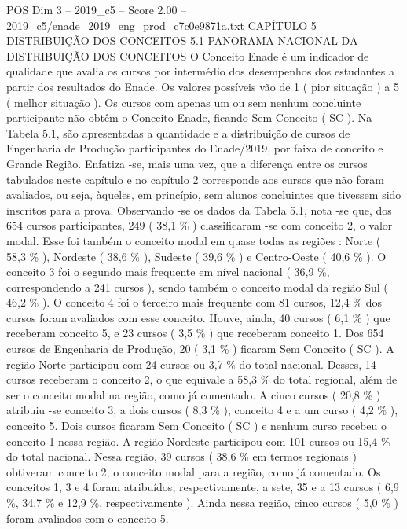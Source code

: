 \begin{textsample}{POS Dim 3 – 2019\_c5 – Score 2.00 – 2019\_c5/enade\_2019\_eng\_prod\_c7c0e9871a.txt}  \label{ex:f3_pos_074}
CAPÍTULO 5 DISTRIBUIÇÃO DOS CONCEITOS 5.1 PANORAMA NACIONAL DA DISTRIBUIÇÃO DOS CONCEITOS O Conceito Enade é um indicador de qualidade que avalia os cursos por intermédio dos desempenhos dos estudantes a partir dos resultados do Enade.
Os valores possíveis vão de 1 ( pior situação ) a 5 ( melhor situação ).
Os cursos com apenas um ou sem nenhum concluinte participante não obtêm o Conceito Enade, ficando Sem Conceito ( SC ).
Na Tabela 5.1, são apresentadas a quantidade e a distribuição de cursos de Engenharia de Produção participantes do Enade/2019, por faixa de conceito e Grande Região.
Enfatiza -se, mais uma vez, que a diferença entre os cursos tabulados neste capítulo e no capítulo 2 corresponde aos cursos que não foram avaliados, ou seja, àqueles, em princípio, sem alunos concluintes que tivessem sido inscritos para a prova.
Observando -se os dados da Tabela 5.1, nota -se que, dos 654 cursos participantes, 249 ( 38,1 \% ) classificaram -se com conceito 2, o valor modal.
Esse foi também o conceito modal em quase todas as regiões : Norte ( 58,3 \% ), Nordeste ( 38,6 \% ), Sudeste ( 39,6 \% ) e Centro-Oeste ( 40,6 \% ).
O conceito 3 foi o segundo mais frequente em nível nacional ( 36,9 \%, correspondendo a 241 cursos ), sendo também o conceito modal da região Sul ( 46,2 \% ).
O conceito 4 foi o terceiro mais frequente com 81 cursos, 12,4 \% dos cursos foram avaliados com esse conceito.
Houve, ainda, 40 cursos ( 6,1 \% ) que receberam conceito 5, e 23 cursos ( 3,5 \% ) que receberam conceito 1.
Dos 654 cursos de Engenharia de Produção, 20 ( 3,1 \% ) ficaram Sem Conceito ( SC ).
A região Norte participou com 24 cursos ou 3,7 \% do total nacional.
Desses, 14 cursos receberam o conceito 2, o que equivale a 58,3 \% do total regional, além de ser o conceito modal na região, como já comentado.
A cinco cursos ( 20,8 \% ) atribuiu -se conceito 3, a dois cursos ( 8,3 \% ), conceito 4 e a um curso ( 4,2 \% ), conceito 5.
Dois cursos ficaram Sem Conceito ( SC ) e nenhum curso recebeu o conceito 1 nessa região.
A região Nordeste participou com 101 cursos ou 15,4 \% do total nacional.
Nessa região, 39 cursos ( 38,6 \% em termos regionais ) obtiveram conceito 2, o conceito modal para a região, como já comentado.
Os conceitos 1, 3 e 4 foram atribuídos, respectivamente, a sete, 35 e a 13 cursos ( 6,9 \%, 34,7 \% e 12,9 \%, respectivamente ).
Ainda nessa região, cinco cursos ( 5,0 \% ) foram avaliados com o conceito 5.

\end{textsample}
